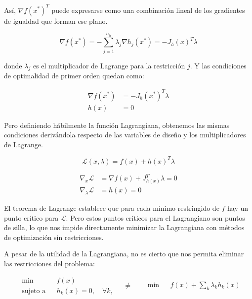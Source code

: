 Así, $\nabla f(x^*)^T$ puede expresarse como una combinación lineal de los
gradientes de igualdad que forman ese plano.

\begin{equation}
	\nabla f(x^*) = - \sum_{j=1}^{n_h} \lambda_j \nabla h_j(x^*) = - J_h(x)^T \lambda
\end{equation}

donde $\lambda_j$ es el multiplicador de Lagrange para la restricción $j$. Y
las condiciones de optimalidad de primer orden quedan como:

\begin{equation}
	\begin{aligned}
		\nabla f(x^*) & = -J_h(x^*)^T \lambda \\
		h(x)          & = 0
	\end{aligned}
\end{equation}

Pero definiendo hábilmente la función Lagrangiana, obtenemos las mismas
condiciones derivándola respecto de las variables de diseño y los
multiplicadores de Lagrange.

\begin{equation}
	\mathcal{L}(x, \lambda) = f(x) + h(x)^T \lambda
\end{equation}

\begin{equation}
	\begin{aligned}
		\nabla_x \mathcal{L}         & = \nabla f(x) + J_{h(x)}^T \lambda = 0 \\
		\nabla_{\lambda} \mathcal{L} & = h(x) = 0
	\end{aligned}
\end{equation}

El teorema de Lagrange establece que para cada mínimo restringido de $f$ hay
un punto crítico para $\mathcal{L}$. Pero estos puntos críticos para el
Lagrangiano son puntos de silla, lo que nos impide directamente minimizar la
Lagrangiana con métodos de optimización sin restricciones.

A pesar de la utilidad de la Lagrangiana, no es cierto que nos permita eliminar las
restricciones del problema:

\begin{equation}
	\begin{aligned}
		 & \min
		 &                 & f(x)                         \\
		 & \text{sujeto a}
		 &                 & h_k(x) = 0, \quad \forall k,
	\end{aligned}
	\quad \neq \quad
	\begin{aligned}
		 & \min
		 &      & f(x) + \sum_{k} \lambda_k h_k(x)
	\end{aligned}
\end{equation}

